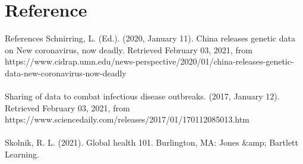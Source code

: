 \documentclass{beamer}
\begin{document}
\section{Reference}
\begin{frame}[<1>][allowframebreaks]{References}
Schnirring, L. (Ed.). (2020, January 11). China releases genetic data on New coronavirus, now deadly. Retrieved February 03, 2021, from https://www.cidrap.umn.edu/news-perspective/2020/01/china-releases-genetic-data-new-coronavirus-now-deadly\\ \\Sharing of data to combat infectious disease outbreaks. (2017, January 12). Retrieved February 03, 2021, from https://www.sciencedaily.com/releases/2017/01/170112085013.htm\\ \\Skolnik, R. L. (2021). Global health 101. Burlington, MA: Jones &amp; Bartlett Learning.
\end{frame}
\end{document}
